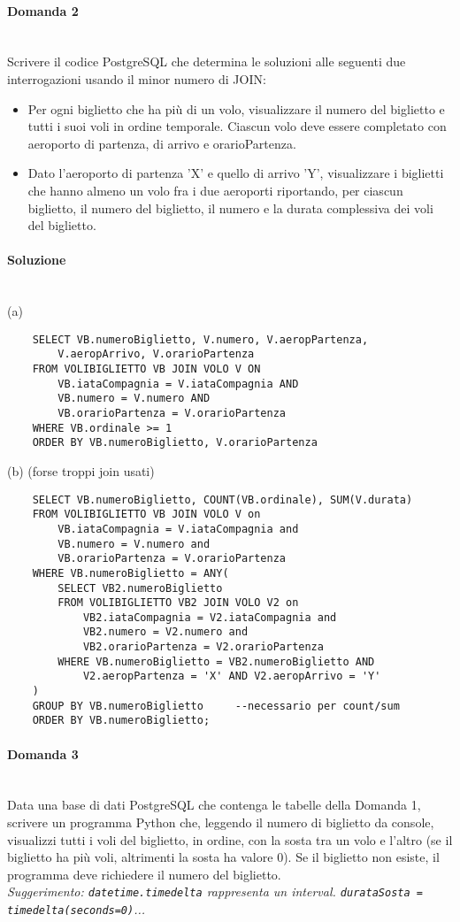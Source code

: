 \documentclass[a4paper, 10pt, titlepage]{article}
\begin{document}
\paragraph{Domanda 2}\dotfill
\\Scrivere il codice PostgreSQL che determina le soluzioni alle seguenti due interrogazioni usando il minor numero di JOIN:
\begin{itemize}
\item[(a)] Per ogni biglietto che ha più di un volo, visualizzare il numero del biglietto e tutti i suoi voli in ordine temporale. Ciascun volo deve essere completato con aeroporto di partenza, di arrivo e orarioPartenza.
\item[(b)] Dato l'aeroporto di partenza 'X' e quello di arrivo 'Y', visualizzare i biglietti che hanno almeno un volo fra i due aeroporti riportando, per ciascun biglietto, il numero del biglietto, il numero e la durata complessiva dei voli del biglietto.
\end{itemize}

\paragraph{Soluzione}\dotfill
\\(a) 
\begin{lstlisting}
	SELECT VB.numeroBiglietto, V.numero, V.aeropPartenza,
		V.aeropArrivo, V.orarioPartenza
	FROM VOLIBIGLIETTO VB JOIN VOLO V ON 
		VB.iataCompagnia = V.iataCompagnia AND 
		VB.numero = V.numero AND 
		VB.orarioPartenza = V.orarioPartenza
	WHERE VB.ordinale >= 1
	ORDER BY VB.numeroBiglietto, V.orarioPartenza
\end{lstlisting}
(b) (forse troppi join usati)
\begin{lstlisting}
	SELECT VB.numeroBiglietto, COUNT(VB.ordinale), SUM(V.durata)
	FROM VOLIBIGLIETTO VB JOIN VOLO V on
 	 	VB.iataCompagnia = V.iataCompagnia and
 		VB.numero = V.numero and
 		VB.orarioPartenza = V.orarioPartenza
	WHERE VB.numeroBiglietto = ANY(
  		SELECT VB2.numeroBiglietto
  		FROM VOLIBIGLIETTO VB2 JOIN VOLO V2 on
    		VB2.iataCompagnia = V2.iataCompagnia and
    		VB2.numero = V2.numero and
    		VB2.orarioPartenza = V2.orarioPartenza
  		WHERE VB.numeroBiglietto = VB2.numeroBiglietto AND
        	V2.aeropPartenza = 'X' AND V2.aeropArrivo = 'Y'
  	)
	GROUP BY VB.numeroBiglietto		--necessario per count/sum
	ORDER BY VB.numeroBiglietto;
\end{lstlisting}

\paragraph{Domanda 3}\dotfill
\\Data una base di dati PostgreSQL che contenga le tabelle della Domanda 1, scrivere un programma Python che, leggendo il numero di biglietto da console, visualizzi tutti i voli del biglietto, in ordine, con la sosta tra un volo e l'altro (se il biglietto ha più voli, altrimenti la sosta ha valore 0). Se il biglietto non esiste, il programma deve richiedere il numero del biglietto.\\
{\small \textit{Suggerimento: \lstinline|datetime.timedelta| rappresenta un interval. \lstinline|durataSosta = timedelta(seconds=0)|...} }
\end{document}
